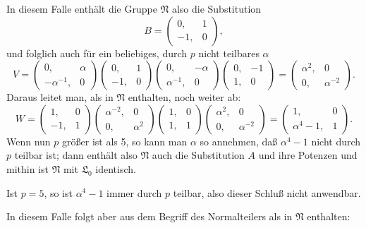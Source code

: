 In diesem Falle enthält die Gruppe $\mathfrak{N}$ also die Substitution
\[
B = \begin{pmatrix} 0, & 1 \\ -1, & 0 \end{pmatrix},
\]
und folglich auch für ein beliebiges, durch $p$ nicht teilbares $\alpha$
\[
V = \begin{pmatrix} 0, & \alpha \\ -\alpha^{-1}, & 0 \end{pmatrix}\begin{pmatrix} 0, & 1 \\ -1, & 0 \end{pmatrix}\begin{pmatrix} 0, & -\alpha \\ \alpha^{-1}, & 0 \end{pmatrix}\begin{pmatrix} 0, & -1 \\ 1, & 0 \end{pmatrix} = \begin{pmatrix} \alpha^2, & 0 \\ 0, & \alpha^{-2} \end{pmatrix}.
\]
Daraus leitet man, als in $\mathfrak{N}$ enthalten, noch weiter ab:
\[
W = \begin{pmatrix} 1, & 0 \\ -1, & 1 \end{pmatrix}\begin{pmatrix} \alpha^{-2}, & 0 \\ 0, & \alpha^2 \end{pmatrix}\begin{pmatrix} 1, & 0 \\ 1, & 1 \end{pmatrix}\begin{pmatrix} \alpha^2, & 0 \\ 0, & \alpha^{-2} \end{pmatrix} = \begin{pmatrix} 1, & 0 \\ \alpha^4-1, & 1 \end{pmatrix}.
\]
Wenn nun $p$ größer ist als 5, so kann man $\alpha$ so annehmen, daß $\alpha^4 - 1$ nicht durch $p$ teilbar ist; dann enthält also $\mathfrak{N}$ auch die Substitution $A$ und ihre Potenzen und mithin ist $\mathfrak{N}$ mit $\mathfrak{L}_0$ identisch.

Ist $p = 5$, so ist $\alpha^4 - 1$ immer durch $p$ teilbar, also dieser Schluß nicht anwendbar.

In diesem Falle folgt aber aus dem Begriff des Normalteilers als in $\mathfrak{N}$ enthalten:
